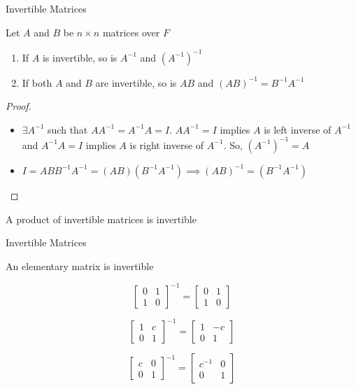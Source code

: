 \documentclass[8pt]{beamer}
\begin{document}
\begin{frame}{Invertible Matrices}
  \begin{theorem}
    Let $A$ and $B$ be $n \times n$ matrices over $F$
    \begin{enumerate}
      \item If $A$ is invertible, so is $A^{-1}$ and $(A^{-1})^{-1}$
      \item If both $A$ and $B$ are invertible, so is $AB$ and $(AB)^{-1} = B^{-1}A^{-1}$
    \end{enumerate}
  \end{theorem}

  \begin{proof}
    \begin{itemize}
      \item $\exists A^{-1}$ such that $A A^{-1} = A^{-1} A = I$. $A A^{-1} = I$ implies $A$ is left inverse of $A^{-1}$ and $A^{-1} A = I$ implies $A$ is right inverse of $A^{-1}$. So, $(A^{-1})^{-1} = A$
      \item $ I = A B B^{-1} A^{-1} = (A B) (B^{-1} A^{-1}) \implies (AB)^{-1} = (B^{-1}A^{-1})$
    \end{itemize}
  \end{proof}

  \begin{corollary}
      A product of invertible matrices is invertible
  \end{corollary}
\end{frame}

\begin{frame}{Invertible Matrices}
  \begin{theorem}
    An elementary matrix is invertible
  \end{theorem}
  \begin{example}
    \[
    \left[\begin{matrix}
    0 & 1 \\ 1 & 0 
    \end{matrix}\right]^{-1} =     \left[\begin{matrix}
    0 & 1 \\ 1 & 0 
    \end{matrix}\right]
    \]

    \[
    \left[\begin{matrix}
    1 & c \\ 0 & 1 
    \end{matrix}\right]^{-1} =      \left[\begin{matrix}
    1 & -c \\ 0 & 1 
    \end{matrix}\right]
    \]

    \[
      \left[\begin{matrix}
    c & 0 \\ 0 & 1
    \end{matrix}\right]^{-1} =       \left[\begin{matrix}
    c^{-1} & 0 \\ 0 & 1
    \end{matrix}\right]
    \]
  \end{example}
\end{frame}
\end{document}

